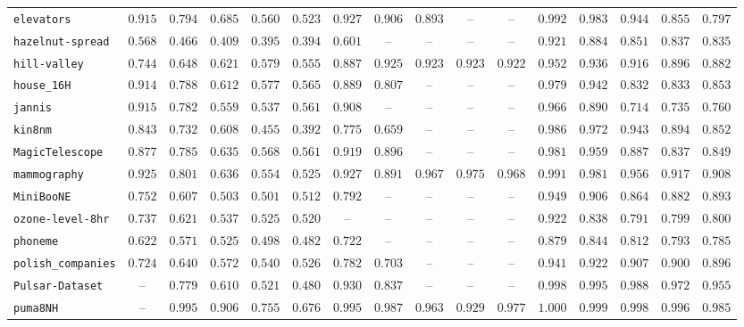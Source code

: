{\begin{tabular}{@{}lccccccccccccccc@{}}
\texttt{elevators} & $0.915$ & $0.794$ & $0.685$ & $0.560$ & $0.523$ & $0.927$ & $0.906$ & $0.893$ & -- & -- & $0.992$ & $0.983$ & $0.944$ & $0.855$ & $0.797$ \\
\texttt{hazelnut-spread} & $0.568$ & $0.466$ & $0.409$ & $0.395$ & $0.394$ & $0.601$ & -- & -- & -- & -- & $0.921$ & $0.884$ & $0.851$ & $0.837$ & $0.835$ \\
\texttt{hill-valley} & $0.744$ & $0.648$ & $0.621$ & $0.579$ & $0.555$ & $0.887$ & $0.925$ & $0.923$ & $0.923$ & $0.922$ & $0.952$ & $0.936$ & $0.916$ & $0.896$ & $0.882$ \\
\texttt{house\_16H} & $0.914$ & $0.788$ & $0.612$ & $0.577$ & $0.565$ & $0.889$ & $0.807$ & -- & -- & -- & $0.979$ & $0.942$ & $0.832$ & $0.833$ & $0.853$ \\
\texttt{jannis} & $0.915$ & $0.782$ & $0.559$ & $0.537$ & $0.561$ & $0.908$ & -- & -- & -- & -- & $0.966$ & $0.890$ & $0.714$ & $0.735$ & $0.760$ \\
\texttt{kin8nm} & $0.843$ & $0.732$ & $0.608$ & $0.455$ & $0.392$ & $0.775$ & $0.659$ & -- & -- & -- & $0.986$ & $0.972$ & $0.943$ & $0.894$ & $0.852$ \\
\texttt{MagicTelescope} & $0.877$ & $0.785$ & $0.635$ & $0.568$ & $0.561$ & $0.919$ & $0.896$ & -- & -- & -- & $0.981$ & $0.959$ & $0.887$ & $0.837$ & $0.849$ \\
\texttt{mammography} & $0.925$ & $0.801$ & $0.636$ & $0.554$ & $0.525$ & $0.927$ & $0.891$ & $0.967$ & $0.975$ & $0.968$ & $0.991$ & $0.981$ & $0.956$ & $0.917$ & $0.908$ \\
\texttt{MiniBooNE} & $0.752$ & $0.607$ & $0.503$ & $0.501$ & $0.512$ & $0.792$ & -- & -- & -- & -- & $0.949$ & $0.906$ & $0.864$ & $0.882$ & $0.893$ \\
\texttt{ozone-level-8hr} & $0.737$ & $0.621$ & $0.537$ & $0.525$ & $0.520$ & -- & -- & -- & -- & -- & $0.922$ & $0.838$ & $0.791$ & $0.799$ & $0.800$ \\
\texttt{phoneme} & $0.622$ & $0.571$ & $0.525$ & $0.498$ & $0.482$ & $0.722$ & -- & -- & -- & -- & $0.879$ & $0.844$ & $0.812$ & $0.793$ & $0.785$ \\
\texttt{polish\_companies} & $0.724$ & $0.640$ & $0.572$ & $0.540$ & $0.526$ & $0.782$ & $0.703$ & -- & -- & -- & $0.941$ & $0.922$ & $0.907$ & $0.900$ & $0.896$ \\
\texttt{Pulsar-Dataset} & -- & $0.779$ & $0.610$ & $0.521$ & $0.480$ & $0.930$ & $0.837$ & -- & -- & -- & $0.998$ & $0.995$ & $0.988$ & $0.972$ & $0.955$ \\
\texttt{puma8NH} & -- & $0.995$ & $0.906$ & $0.755$ & $0.676$ & $0.995$ & $0.987$ & $0.963$ & $0.929$ & $0.977$ & $1.000$ & $0.999$ & $0.998$ & $0.996$ & $0.985$ \\

\end{tabular}}

